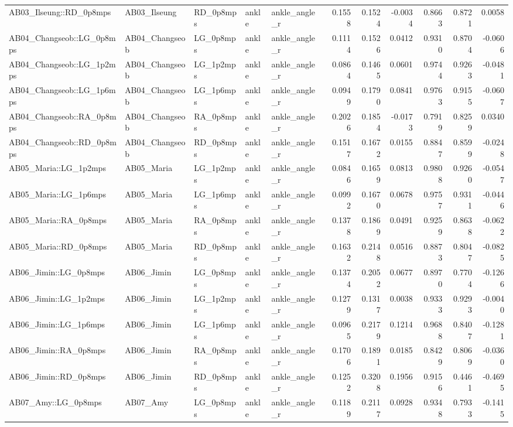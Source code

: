 \begin{table}
\begin{tabular}{lllllrrrrrr}
AB03_Ilseung::RD_0p8mps & AB03_Ilseung & RD_0p8mps & ankle & ankle_angle_r & 0.1558 & 0.1524 & -0.0034 & 0.8663 & 0.8721 & 0.0058 \\
AB04_Changseob::LG_0p8mps & AB04_Changseob & LG_0p8mps & ankle & ankle_angle_r & 0.1114 & 0.1526 & 0.0412 & 0.9310 & 0.8704 & -0.0606 \\
AB04_Changseob::LG_1p2mps & AB04_Changseob & LG_1p2mps & ankle & ankle_angle_r & 0.0864 & 0.1465 & 0.0601 & 0.9744 & 0.9263 & -0.0481 \\
AB04_Changseob::LG_1p6mps & AB04_Changseob & LG_1p6mps & ankle & ankle_angle_r & 0.0949 & 0.1790 & 0.0841 & 0.9763 & 0.9155 & -0.0607 \\
AB04_Changseob::RA_0p8mps & AB04_Changseob & RA_0p8mps & ankle & ankle_angle_r & 0.2026 & 0.1854 & -0.0173 & 0.7919 & 0.8259 & 0.0340 \\
AB04_Changseob::RD_0p8mps & AB04_Changseob & RD_0p8mps & ankle & ankle_angle_r & 0.1517 & 0.1672 & 0.0155 & 0.8847 & 0.8599 & -0.0248 \\
AB05_Maria::LG_1p2mps & AB05_Maria & LG_1p2mps & ankle & ankle_angle_r & 0.0846 & 0.1659 & 0.0813 & 0.9808 & 0.9260 & -0.0547 \\
AB05_Maria::LG_1p6mps & AB05_Maria & LG_1p6mps & ankle & ankle_angle_r & 0.0992 & 0.1670 & 0.0678 & 0.9757 & 0.9311 & -0.0446 \\
AB05_Maria::RA_0p8mps & AB05_Maria & RA_0p8mps & ankle & ankle_angle_r & 0.1378 & 0.1869 & 0.0491 & 0.9259 & 0.8638 & -0.0622 \\
AB05_Maria::RD_0p8mps & AB05_Maria & RD_0p8mps & ankle & ankle_angle_r & 0.1632 & 0.2148 & 0.0516 & 0.8873 & 0.8047 & -0.0825 \\
AB06_Jimin::LG_0p8mps & AB06_Jimin & LG_0p8mps & ankle & ankle_angle_r & 0.1374 & 0.2052 & 0.0677 & 0.8970 & 0.7704 & -0.1266 \\
AB06_Jimin::LG_1p2mps & AB06_Jimin & LG_1p2mps & ankle & ankle_angle_r & 0.1279 & 0.1317 & 0.0038 & 0.9333 & 0.9293 & -0.0040 \\
AB06_Jimin::LG_1p6mps & AB06_Jimin & LG_1p6mps & ankle & ankle_angle_r & 0.0965 & 0.2179 & 0.1214 & 0.9688 & 0.8407 & -0.1281 \\
AB06_Jimin::RA_0p8mps & AB06_Jimin & RA_0p8mps & ankle & ankle_angle_r & 0.1706 & 0.1891 & 0.0185 & 0.8429 & 0.8069 & -0.0360 \\
AB06_Jimin::RD_0p8mps & AB06_Jimin & RD_0p8mps & ankle & ankle_angle_r & 0.1252 & 0.3208 & 0.1956 & 0.9156 & 0.4461 & -0.4695 \\
AB07_Amy::LG_0p8mps & AB07_Amy & LG_0p8mps & ankle & ankle_angle_r & 0.1189 & 0.2117 & 0.0928 & 0.9348 & 0.7933 & -0.1415 \\

\end{tabular}
\end{table}

